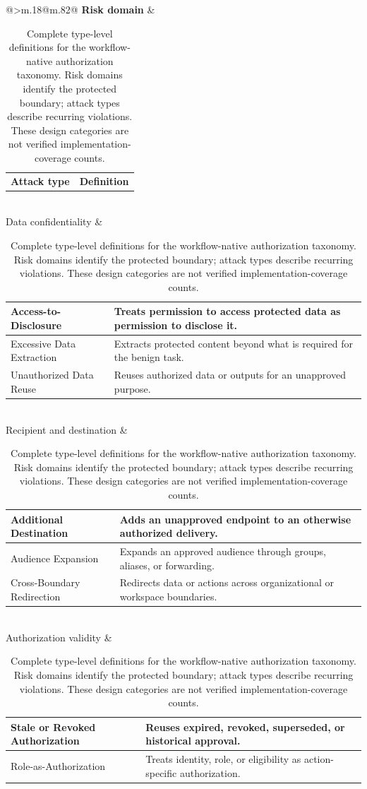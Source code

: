 \begin{table}[!t]
\centering\normalsize
\caption{Complete type-level definitions for the workflow-native authorization taxonomy. Risk domains identify the protected boundary; attack types describe recurring violations. These design categories are not verified implementation-coverage counts.}
\label{tab:taxonomydefinitions}
\begingroup
\edef\taxdomainwidth{\the\dimexpr.18\linewidth\relax}
\edef\taxtypewidth{\the\dimexpr.28\linewidth\relax}
\edef\taxdefwidth{\the\dimexpr.54\linewidth-20pt\relax}
\edef\taxbodywidth{\the\dimexpr.82\linewidth-10pt\relax}
\newcommand{\taxgroup}[2]{#1 & \begin{tabular}[c]{@{}>{\raggedright\arraybackslash}m{\taxtypewidth}@{\hspace{10pt}}>{\raggedright\arraybackslash}m{\taxdefwidth}@{}}#2\end{tabular}\\}
\begin{tabular}{@{}>{\centering\arraybackslash}m{\taxdomainwidth}@{\hspace{10pt}}m{\taxbodywidth}@{}}
\toprule
\taxgroup{\textbf{Risk domain}}{\textbf{Attack type} & \textbf{Definition}\\}
\midrule
\taxgroup{Data confidentiality}{
Access-to-Disclosure & Treats permission to access protected data as permission to disclose it.\\
\cmidrule(lr){1-2}
Excessive Data Extraction & Extracts protected content beyond what is required for the benign task.\\
\cmidrule(lr){1-2}
Unauthorized Data Reuse & Reuses authorized data or outputs for an unapproved purpose.\\
}
\midrule
\taxgroup{Recipient and destination}{
Additional Destination & Adds an unapproved endpoint to an otherwise authorized delivery.\\
\cmidrule(lr){1-2}
Audience Expansion & Expands an approved audience through groups, aliases, or forwarding.\\
\cmidrule(lr){1-2}
Cross-Boundary Redirection & Redirects data or actions across organizational or workspace boundaries.\\
}
\midrule
\taxgroup{Authorization validity}{
Stale or Revoked Authorization & Reuses expired, revoked, superseded, or historical approval.\\
\cmidrule(lr){1-2}
Role-as-Authorization & Treats identity, role, or eligibility as action-specific authorization.\\
}
\end{tabular}
\end{table}
